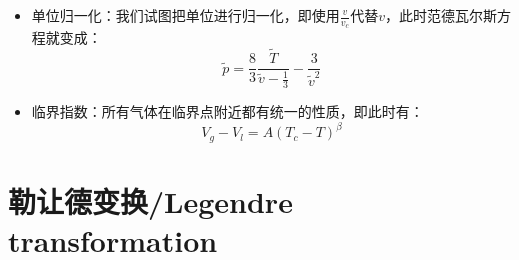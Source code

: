 \documentclass[a4paper, 10pt, openany]{book}%
\begin{document}
\begin{itemize}
\item 单位归一化：我们试图把单位进行归一化，即使用$\frac{v}{v_c}$代替$v$，此时范德瓦尔斯方程就变成：
\begin{equation}
\tilde{p}=\frac{8}{3}\frac{\tilde{T}}{\tilde{v}-\frac{1}{3}}-\frac{3}{\tilde{v}^2}
\end{equation}

\item 临界指数：所有气体在临界点附近都有统一的性质，即此时有：
\begin{equation}
V_g-V_l=A(T_c-T)^\beta
\end{equation}
\end{itemize}



























\newpage
\appendix
\chapter{勒让德变换/Legendre transformation}
\end{document}
